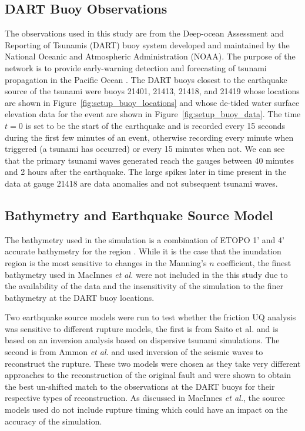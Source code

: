 \subsection{DART Buoy Observations}

The observations used in this study are from the Deep-ocean Assessment and
Reporting of Tsunamis (DART) buoy system developed and maintained by the
National Oceanic and Atmospheric Administration (NOAA).  The purpose of the
network is to provide early-warning detection and forecasting of tsunami
propagation in the Pacific Ocean \cite{Milburn:1996wm}.  The DART buoys closest
to the earthquake source of the \tohoku tsunami were buoys 21401, 21413, 21418,
and 21419 whose locations are shown in Figure~\ref{fig:setup_buoy_locations} and
whose de-tided water surface elevation data for the event are shown in
Figure~\ref{fig:setup_buoy_data}. The time $t=0$ is set to be the start of the
earthquake and is recorded every 15 seconds during the first few minutes of an
event, otherwise recording every minute when triggered (a tsunami has occurred)
or every 15 minutes when not.  We can see that the primary tsunami
waves generated reach the gauges between 40 minutes and 2 hours after the
earthquake.  The large spikes later in time present in the data at gauge 21418
are data anomalies and not subsequent tsunami waves.

\subsection{Bathymetry and Earthquake Source Model}

The bathymetry used in the simulation is a combination of ETOPO 1' and 4'
accurate bathymetry for the region \cite{Amante:2009ud}.  While it is the case
that the inundation region is the most sensitive to changes in the Manning's $n$
coefficient, the finest bathymetry used in MacInnes \emph{et al.} were
not included in the this study due to the availability of the data and the
insensitivity of the simulation to the finer bathymetry at the DART buoy
locations.    

Two earthquake source models were run to test whether the friction UQ analysis
was sensitive to different rupture models, the first is from Saito et al.
\cite{Saito:2011bh} and is based on an inversion analysis based on dispersive
tsunami simulations.  The second is from Ammon \emph{et al.} \cite{Ammon:2011dm} and
used inversion of the seismic waves to reconstruct the rupture.  These two
models were chosen as they take very different approaches to the reconstruction
of the original fault and were shown to obtain the best un-shifted match to the
observations at the DART buoys for their respective types of reconstruction.  As
discussed in MacInnes \emph{et al.}, the source models used do not include rupture
timing which could have an impact on the accuracy of the simulation.

